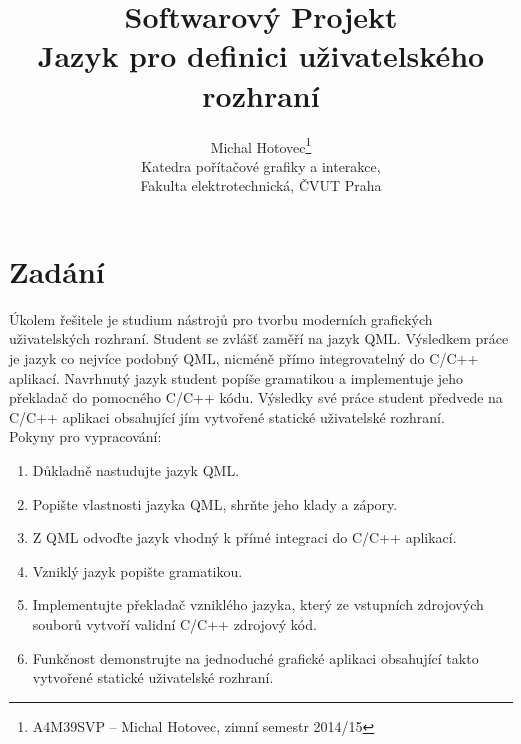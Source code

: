 \documentclass[report,11pt]{elsarticle}
\begin{document}
\begin{frontmatter}

\title{Softwarový Projekt\\ Jazyk pro definici uživatelského rozhraní}

\author{Michal Hotovec\footnote{A4M39SVP -- Michal Hotovec, zimní semestr 2014/15}\\
Katedra pořítačové grafiky a interakce,\\ Fakulta elektrotechnická, ČVUT Praha
}

\date{}



\end{frontmatter}



\section{\label{SEC:Intro}Zadání}
Úkolem řešitele je studium nástrojů pro tvorbu moderních grafických uživatelských rozhraní.
Student se zvlášť zaměří na jazyk QML. Výsledkem práce je jazyk co nejvíce podobný QML,
nicméně přímo integrovatelný do C/C++ aplikací. Navrhnutý jazyk student popíše gramatikou a
implementuje jeho překladač do pomocného C/C++ kódu. Výsledky své práce student předvede na
C/C++ aplikaci obsahující jím vytvořené statické uživatelské rozhraní.\\
Pokyny pro vypracování:
\begin{enumerate}
\item Důkladně nastudujte jazyk QML.
\item Popište vlastnosti jazyka QML, shrňte jeho klady a zápory.
\item Z QML odvoďte jazyk vhodný k přímé integraci do C/C++ aplikací.
\item Vzniklý jazyk popište gramatikou.
\item Implementujte překladač vzniklého jazyka, který ze vstupních zdrojových souborů vytvoří
validní C/C++ zdrojový kód.
\item Funkčnost demonstrujte na jednoduché grafické aplikaci obsahující takto vytvořené statické
uživatelské rozhraní.
\end{enumerate}
\end{document}
